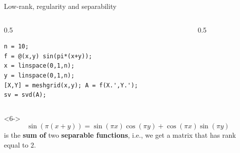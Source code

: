 \documentclass[aspectratio=169,xcolor=dvipsnames]{beamer}
\begin{document}
\begin{frame}[fragile]{Low-rank, regularity and separability}
\begin{onlyenv}
\begin{onlyenv}
\begin{columns}
\begin{column}{0.5\columnwidth}
\begin{verbatim}
n = 10;
f = @(x,y) sin(pi*(x+y));
x = linspace(0,1,n); 
y = linspace(0,1,n);
[X,Y] = meshgrid(x,y); A = f(X.',Y.'); 
sv = svd(A);
\end{verbatim}
	\end{column}
	\begin{column}{0.5\columnwidth}
	
	\end{column}
	\end{columns}
	\end{onlyenv}
	\begin{onlyenv}<6->
	\[
	\sin(\pi(x+y)) = \sin (\pi  x) \cos (\pi  y)+\cos (\pi  x) \sin (\pi  y)
	\]
	is the \textbf{sum of} two \textbf{separable functions}, i.e., we get a matrix that has rank equal to $2$.
	
	\end{onlyenv}
	\end{onlyenv}
	\end{frame}
\end{document}
